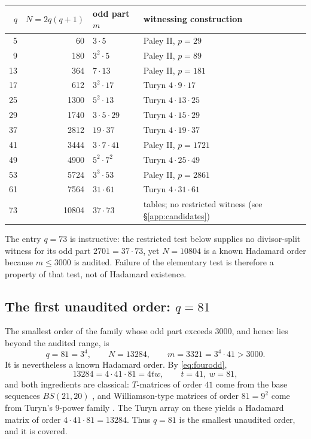 \documentclass[11pt]{article}
\begin{document}
\begin{center}
\begin{tabular}{r r l l}
\(q\) & \(N=2q(q+1)\) & odd part \(m\) & witnessing construction\\\hline
5  & 60    & \(3\cdot5\)        & Paley II, \(p=29\)\\
9  & 180   & \(3^{2}\cdot5\)    & Paley II, \(p=89\)\\
13 & 364   & \(7\cdot13\)       & Paley II, \(p=181\)\\
17 & 612   & \(3^{2}\cdot17\)   & Turyn \(4\cdot9\cdot17\)\\
25 & 1300  & \(5^{2}\cdot13\)   & Turyn \(4\cdot13\cdot25\)\\
29 & 1740  & \(3\cdot5\cdot29\) & Turyn \(4\cdot15\cdot29\)\\
37 & 2812  & \(19\cdot37\)      & Turyn \(4\cdot19\cdot37\)\\
41 & 3444  & \(3\cdot7\cdot41\) & Paley II, \(p=1721\)\\
49 & 4900  & \(5^{2}\cdot7^{2}\)& Turyn \(4\cdot25\cdot49\)\\
53 & 5724  & \(3^{3}\cdot53\)   & Paley II, \(p=2861\)\\
61 & 7564  & \(31\cdot61\)      & Turyn \(4\cdot31\cdot61\)\\
73 & 10804 & \(37\cdot73\)      & tables; no restricted witness (see \S\ref{app:candidates})\\
\end{tabular}
\end{center}

\noindent
The entry \(q=73\) is instructive: the restricted test below supplies no
divisor-split witness for its odd part \(2701=37\cdot73\), yet
\(N=10804\) is a known Hadamard order because \(m\le3000\) is audited.
Failure of the elementary test is therefore a property of that test, not
of Hadamard existence.

\subsection{The first unaudited order: \texorpdfstring{\(q=81\)}{q=81}}
\label{app:81}

The smallest order of the family whose odd part exceeds \(3000\), and
hence lies beyond the audited range, is
\[
        q=81=3^{4},\qquad N=13284,\qquad m=3321=3^{4}\cdot41>3000 .
\]
It is nevertheless a known Hadamard order.  By \eqref{eq:fourodd},
\[
        13284 = 4\cdot 41\cdot 81 = 4tw,\qquad t=41,\ w=81,
\]
and both ingredients are classical: \(T\)-matrices of order \(41\) come
from the base sequences \(BS(21,20)\) \cite{Turyn1974,
KharaghaniTayfehRezaie2005}, and Williamson-type matrices of order
\(81=9^{2}\) come from Turyn's \(9\)-power family
\cite{Turyn1974,SeberryYamada1992}.  The Turyn array on these
\cite{SeberryYamada1992,SeberryYamada2020} yields a Hadamard matrix of
order \(4\cdot41\cdot81=13284\).  Thus \(q=81\) is the smallest unaudited
order, and it is covered.
\end{document}
